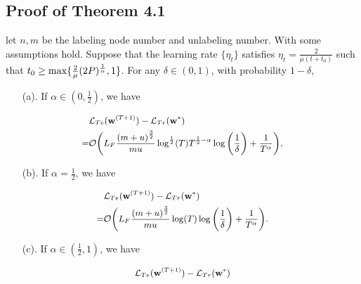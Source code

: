 \subsection{Proof of Theorem 4.1}\label{the:4.1} 
\begin{lemma}\cite{tang2023towards}\label{th3}
    let $n,m$ be the labeling node number and unlabeling number. With some assumptions hold. Suppose that the learning rate $\{\eta_t\}$ satisfies $\eta_t = \frac{2}{\mu(t+t_0)}$ such that $t_0 \geq {\rm max}\{ \frac{2}{\mu}(2P)^{\frac{1}{\alpha}}, 1 \}$. For any $\delta \in (0,1)$, with probability $1-\delta$, 
        \begin{itemize}
        \item[(a).] If $\alpha \in (0, \frac{1}{2})$, we have
        \end{itemize}
        \begin{equation*}\small
        \begin{aligned}
        & \mathcal{L}_{Te}(\mathbf{w}^{(T+1)}) - \mathcal{L}_{Tr}(\mathbf{w}^*) \\
        = & \mathcal{O} \bigg( L_F \frac{{(m+u)}^{\frac{3}{2}}}{mu} \log^{\frac{1}{2}}(T)T^{\frac{1}{2}-\alpha}\log \bigg( \frac{1}{\delta} \bigg) + \frac{1}{T^\alpha} \bigg),
        \end{aligned}
        \end{equation*}
        \begin{itemize}
        \item[(b).] If $\alpha = \frac{1}{2}$, we have
        \end{itemize}
        \begin{equation*}\small
        \begin{aligned}
            & \mathcal{L}_{Te}(\mathbf{w}^{(T+1)}) - \mathcal{L}_{Tr}(\mathbf{w}^*) \\
            = & \mathcal{O} \bigg( L_F \frac{{(m+u)}^{\frac{3}{2}}}{mu} \log(T) \log \bigg( \frac{1}{\delta} \bigg) + \frac{1}{T^\alpha} \bigg).
        \end{aligned}
        \end{equation*}
        \begin{itemize}
        \item[(c).] If $\alpha \in (\frac{1}{2}, 1)$, we have
        \end{itemize}
        \begin{equation*}\small
        \begin{aligned}
            & \mathcal{L}_{Te}(\mathbf{w}^{(T+1)}) - \mathcal{L}_{Tr}(\mathbf{w}^*) \\

\end{aligned}
\end{equation*}
\end{lemma}
